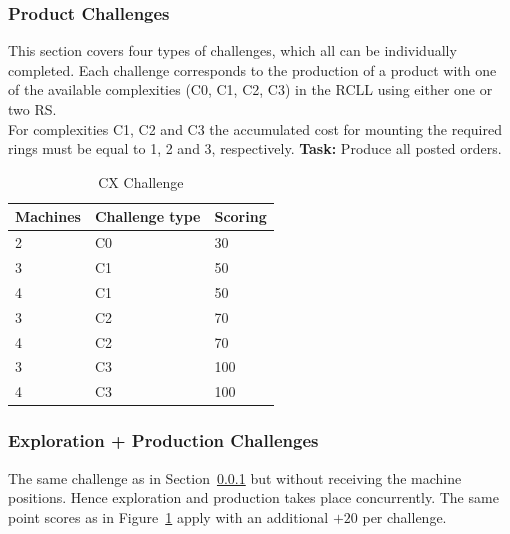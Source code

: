 \documentclass[12pt,twoside]{article}
\newcommand{\refsec}[1]{Section~\ref{#1}}
\newcommand{\reffig}[1]{Figure~\ref{#1}}
\begin{document}
\subsubsection{Product Challenges}\label{sec:challenge-cx}
This section covers four types of challenges, which all can be individually
completed.
Each challenge corresponds to the production of a product with one of the
available complexities (C0, C1, C2, C3) in the \ac{RCLL} using either
one or two \ac{RS}.\\
For complexities C1, C2 and C3 the accumulated cost for mounting the required
rings must be equal to 1, 2 and 3, respectively.
\textbf{Task:} Produce all posted orders.\\
\begin{table}[!htb]
 \centering
 \begin{tabular}{l|l|l}
  Machines & Challenge type & Scoring \\\hline
  2 & C0 & 30 \\
  3 & C1 & 50 \\
  4 & C1 & 50 \\
  3 & C2 & 70 \\
  4 & C2 & 70 \\
  3 & C3 & 100 \\
  4 & C3 & 100 \\
 \end{tabular}
 \caption{CX Challenge}
 \label{tab:challenge-cx}
\end{table}

\subsubsection{Exploration + Production Challenges}\label{sec:challenge-combine-exp-c0} %
The same challenge as in \refsec{sec:challenge-cx} but without receiving the
machine positions. Hence exploration and production takes place concurrently.
The same point scores as in \reffig{tab:challenge-cx} apply with an additional
$+20$ per challenge.
\end{document}
